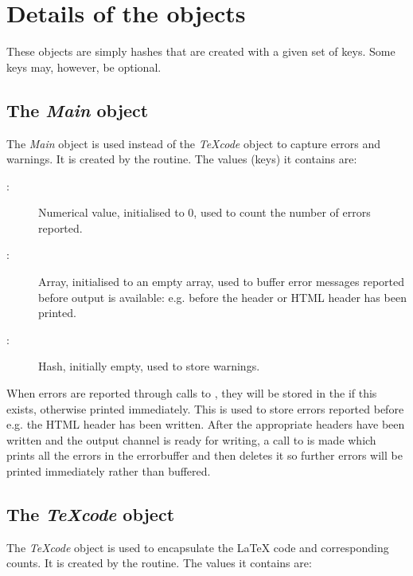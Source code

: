 \documentclass{article}
\newcommand\Obj[1]{\textsl{#1}}
\begin{document}
\section{Details of the \TeXcount{} objects}\label{sec:objects}

These objects are simply hashes that are created with a given set of keys. Some keys may, however, be optional.


\subsection{The \Obj{Main} object}

The \Obj{Main} object is used instead of the \Obj{TeXcode} object to capture errors and warnings. It is created by the  routine. The values (keys) it contains are:

\begin{description}

\item[:] Numerical value, initialised to 0, used to count the number of errors reported.

\item[:] Array, initialised to an empty array, used to buffer error messages reported before output is available: e.g. before the header or HTML header has been printed.

\item[:] Hash, initially empty, used to store warnings.

\end{description}

When errors are reported through calls to , they will be stored in the  if this exists, otherwise printed immediately. This is used to store errors reported before e.g. the HTML header has been written. After the appropriate headers have been written and the output channel is ready for writing, a call to  is made which prints all the errors in the errorbuffer and then deletes it so further errors will be printed immediately rather than buffered.


\subsection{The \Obj{TeXcode} object}

The \Obj{TeXcode} object is used to encapsulate the \LaTeX{} code and corresponding counts. It is created by the  routine. The values it contains are:
\end{document}
